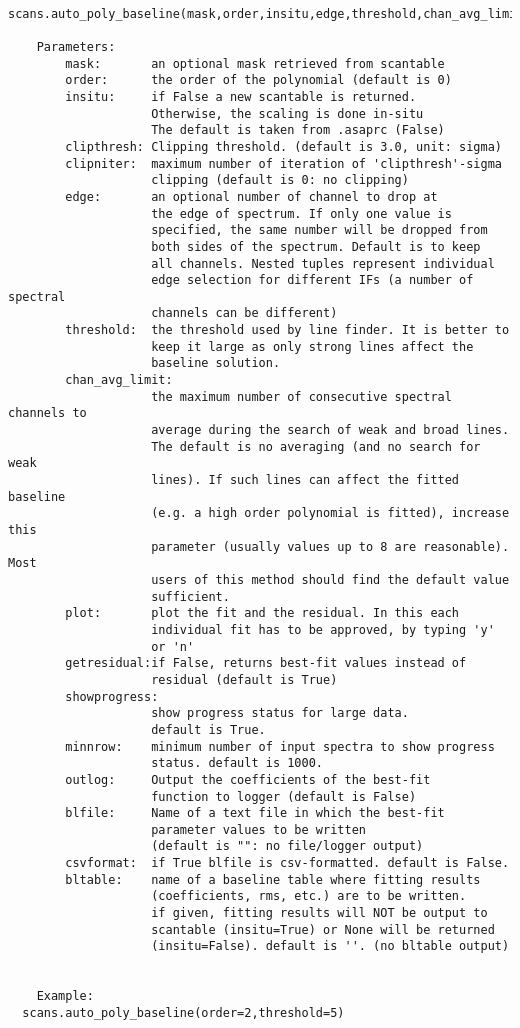 \small
\begin{verbatim}
  scans.auto_poly_baseline(mask,order,insitu,edge,threshold,chan_avg_limit,plot,...):

    Parameters:
        mask:       an optional mask retrieved from scantable
        order:      the order of the polynomial (default is 0)
        insitu:     if False a new scantable is returned.
                    Otherwise, the scaling is done in-situ
                    The default is taken from .asaprc (False)
        clipthresh: Clipping threshold. (default is 3.0, unit: sigma)
        clipniter:  maximum number of iteration of 'clipthresh'-sigma 
                    clipping (default is 0: no clipping)
        edge:       an optional number of channel to drop at
                    the edge of spectrum. If only one value is
                    specified, the same number will be dropped from
                    both sides of the spectrum. Default is to keep
                    all channels. Nested tuples represent individual
                    edge selection for different IFs (a number of spectral
                    channels can be different)
        threshold:  the threshold used by line finder. It is better to
                    keep it large as only strong lines affect the
                    baseline solution.
        chan_avg_limit:
                    the maximum number of consecutive spectral channels to
                    average during the search of weak and broad lines.
                    The default is no averaging (and no search for weak
                    lines). If such lines can affect the fitted baseline
                    (e.g. a high order polynomial is fitted), increase this
                    parameter (usually values up to 8 are reasonable). Most
                    users of this method should find the default value
                    sufficient.
        plot:       plot the fit and the residual. In this each
                    individual fit has to be approved, by typing 'y'
                    or 'n'
        getresidual:if False, returns best-fit values instead of 
                    residual (default is True)
        showprogress:
                    show progress status for large data. 
                    default is True.
        minnrow:    minimum number of input spectra to show progress 
                    status. default is 1000.
        outlog:     Output the coefficients of the best-fit 
                    function to logger (default is False)
        blfile:     Name of a text file in which the best-fit 
                    parameter values to be written 
                    (default is "": no file/logger output)
        csvformat:  if True blfile is csv-formatted. default is False.
        bltable:    name of a baseline table where fitting results 
                    (coefficients, rms, etc.) are to be written. 
                    if given, fitting results will NOT be output to 
                    scantable (insitu=True) or None will be returned 
                    (insitu=False). default is ''. (no bltable output)


    Example:
  scans.auto_poly_baseline(order=2,threshold=5)
\end{verbatim}
\normalsize

